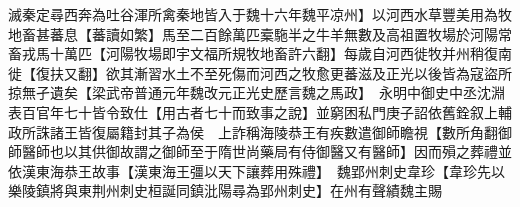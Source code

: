 滅秦定尋西奔為吐谷渾所禽秦地皆入于魏十六年魏平凉州】以河西水草豐美用為牧地畜甚蕃息【蕃讀如繁】馬至二百餘萬匹槖駞半之牛羊無數及高祖置牧場於河陽常畜戎馬十萬匹【河陽牧場即宇文福所規牧地畜許六翻】每歲自河西徙牧并州稍復南徙【復扶又翻】欲其漸習水土不至死傷而河西之牧愈更蕃滋及正光以後皆為寇盜所掠無孑遺矣【梁武帝普通元年魏改元正光史歷言魏之馬政】　永明中御史中丞沈淵表百官年七十皆令致仕【用古者七十而致事之說】並窮困私門庚子詔依舊銓叙上輔政所誅諸王皆復屬籍封其子為侯　上詐稱海陵恭王有疾數遣御師瞻視【數所角翻御師醫師也以其供御故謂之御師至于隋世尚藥局有侍御醫又有醫師】因而殞之葬禮並依漢東海恭王故事【漢東海王彊以天下讓葬用殊禮】　魏郢州刺史韋珍【韋珍先以樂陵鎮將與東荆州刺史桓誕同鎮沘陽尋為郢州刺史】在州有聲績魏主賜
